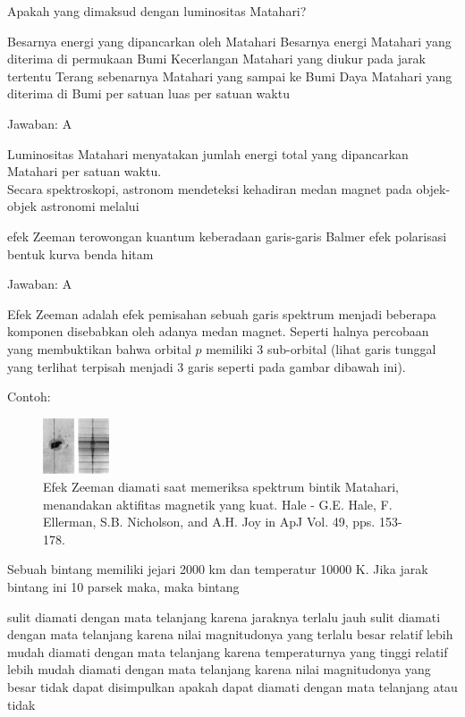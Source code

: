 \documentclass[11pt,fleqn]{exam}
\begin{document}
\begin{questions}
\question Apakah yang dimaksud dengan luminositas Matahari?
\begin{choices}
\choice Besarnya energi yang dipancarkan oleh Matahari
\choice Besarnya energi Matahari yang diterima di permukaan Bumi
\choice Kecerlangan Matahari yang diukur pada jarak tertentu
\choice Terang sebenarnya Matahari yang sampai ke Bumi
\choice Daya Matahari yang diterima di Bumi per satuan luas per satuan waktu
\end{choices}

Jawaban: A

Luminositas Matahari menyatakan jumlah energi total yang dipancarkan Matahari per satuan waktu.\\

\question Secara spektroskopi, astronom mendeteksi kehadiran medan magnet pada objek-objek astronomi melalui
\begin{choices}
\choice efek Zeeman
\choice terowongan kuantum
\choice keberadaan garis-garis Balmer
\choice efek polarisasi
\choice bentuk kurva benda hitam
\end{choices}

Jawaban: A

Efek Zeeman adalah efek pemisahan sebuah garis spektrum menjadi beberapa komponen disebabkan oleh adanya medan magnet. Seperti halnya percobaan yang membuktikan bahwa orbital $p$ memiliki 3 sub-orbital (lihat garis tunggal yang terlihat terpisah menjadi 3 garis seperti pada gambar dibawah ini).

Contoh:
\begin{figure}[H]
\centering
\includegraphics[width=0.175\textwidth]{Sun_zeeman.png}
\caption{Efek Zeeman diamati saat memeriksa spektrum bintik Matahari, menandakan aktifitas magnetik yang kuat. Hale - G.E. Hale, F. Ellerman, S.B. Nicholson, and A.H. Joy in ApJ Vol. 49, pps. 153-178.}
\end{figure}

\question Sebuah bintang memiliki jejari 2000 km dan temperatur 10000 K. Jika jarak bintang ini 10 parsek maka, maka bintang
\begin{choices}
\choice sulit diamati dengan mata telanjang karena jaraknya terlalu jauh
\choice sulit diamati dengan mata telanjang karena nilai magnitudonya yang terlalu besar
\choice relatif lebih mudah diamati dengan mata telanjang karena temperaturnya yang tinggi
\choice relatif lebih mudah diamati dengan mata telanjang karena nilai magnitudonya yang besar
\choice tidak dapat disimpulkan apakah dapat diamati dengan mata telanjang atau tidak
\end{choices}


\end{questions}
\end{document}
